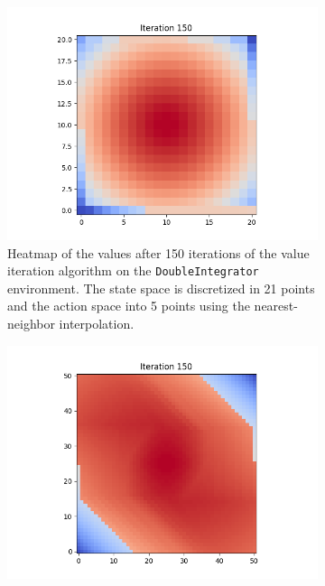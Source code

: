 \documentclass{article}
\begin{document}
\begin{enumerate}[(a)]
\begin{figure}[h!]
    \centering
    \begin{subfigure}{0.3\textwidth}
        \centering
        \includegraphics[width=\textwidth]{figures/part_2_a_a.png}
        \caption{Heatmap of the values after 150 iterations of the value iteration algorithm on the \texttt{DoubleIntegrator} environment. 
                The state space is discretized in 21 points and the action space into 5 points using the nearest-neighbor interpolation.}
    \end{subfigure}
    \hspace{0.1 in}
    \begin{subfigure}{0.3\textwidth}
        \centering
        \includegraphics[width=\textwidth]{figures/part_2_a_b.png}

\end{subfigure}
\end{figure}
\end{enumerate}
\end{document}
